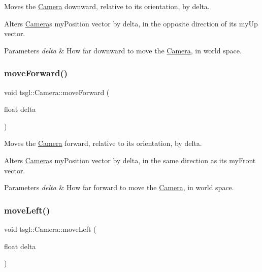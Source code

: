 Moves the \hyperlink{classtsgl_1_1_camera}{Camera} downward, relative to its orientation, by delta. 

Alters \hyperlink{classtsgl_1_1_camera}{Camera}\textquotesingle{}s my\+Position vector by delta, in the opposite direction of its my\+Up vector. 
\begin{DoxyParams}{Parameters}
{\em delta} & How far downward to move the \hyperlink{classtsgl_1_1_camera}{Camera}, in world space. \\
\hline
\end{DoxyParams}
\mbox{\label{classtsgl_1_1_camera_a9f8d73bb09703cfe3e46dea725dca49a}} 
\subsubsection{\texorpdfstring{move\+Forward()}{moveForward()}}
{\footnotesize\ttfamily void tsgl\+::\+Camera\+::move\+Forward (\begin{DoxyParamCaption}\item[{float}]{delta }\end{DoxyParamCaption})}



Moves the \hyperlink{classtsgl_1_1_camera}{Camera} forward, relative to its orientation, by delta. 

Alters \hyperlink{classtsgl_1_1_camera}{Camera}\textquotesingle{}s my\+Position vector by delta, in the same direction as its my\+Front vector. 
\begin{DoxyParams}{Parameters}
{\em delta} & How far forward to move the \hyperlink{classtsgl_1_1_camera}{Camera}, in world space. \\
\hline
\end{DoxyParams}
\mbox{\label{classtsgl_1_1_camera_a9cd60e2a3e521263a548700d08c73cb3}} 
\subsubsection{\texorpdfstring{move\+Left()}{moveLeft()}}
{\footnotesize\ttfamily void tsgl\+::\+Camera\+::move\+Left (\begin{DoxyParamCaption}\item[{float}]{delta }\end{DoxyParamCaption})}



